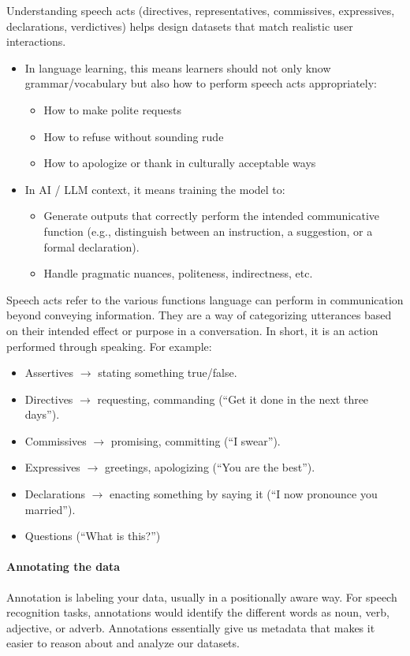 Understanding speech acts (directives, representatives, commissives, expressives, declarations, verdictives) helps design datasets that match realistic user interactions.
\begin{itemize}
	\item In language learning, this means learners should not only know grammar/vocabulary but also how to perform speech acts appropriately:
		\begin{itemize}
			\item How to make polite requests
			\item How to refuse without sounding rude
			\item How to apologize or thank in culturally acceptable ways
		\end{itemize}
	\item In AI / LLM context, it means training the model to:
		\begin{itemize}
			\item Generate outputs that correctly perform the intended communicative function (e.g., distinguish between an instruction, a suggestion, or a formal declaration).
			\item Handle pragmatic nuances, politeness, indirectness, etc.
		\end{itemize}
\end{itemize}
Speech acts refer to the various functions language can perform in communication beyond conveying information. They are a way of categorizing utterances based on their intended effect or purpose in a conversation. In short, it is an action performed through speaking. For example: 
\begin{itemize}
	\item Assertives $\to$ stating something true/false.
	\item Directives $\to$ requesting, commanding (\eg ``Get it done in the next three days'').
	\item Commissives $\to$ promising, committing (\eg ``I swear'').
	\item Expressives $\to$ greetings, apologizing (\eg ``You are the best'').
	\item Declarations $\to$ enacting something by saying it (\eg ``I now pronounce you married'').
	\item Questions (\eg ``What is this?'')
\end{itemize}

\paragraph{Annotating the data}
Annotation is labeling your data, usually in a positionally aware way. For speech recognition tasks, annotations would identify the different words as noun, verb, adjective, or adverb. Annotations essentially give us metadata that makes it easier to reason about and analyze our datasets. 

